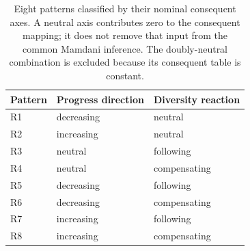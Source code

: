\begin{table}[H]
\centering
\small
\caption{Eight patterns classified by their nominal consequent axes. A neutral axis contributes zero to the consequent mapping; it does not remove that input from the common Mamdani inference. The doubly-neutral combination is excluded because its consequent table is constant.}
\label{tab:rule_axes}
\begin{tabular}{lll}
\toprule
\textbf{Pattern} & \textbf{Progress direction} & \textbf{Diversity reaction} \\
\midrule
R1 & decreasing & neutral \\
R2 & increasing & neutral \\
R3 & neutral & following \\
R4 & neutral & compensating \\
R5 & decreasing & following \\
R6 & decreasing & compensating \\
R7 & increasing & following \\
R8 & increasing & compensating \\
\bottomrule
\end{tabular}
\end{table}
